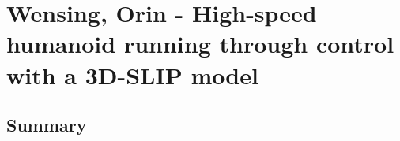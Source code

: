 \section{Wensing, Orin - High-speed humanoid running through control with a 3D-SLIP model}


\subsection*{Summary}